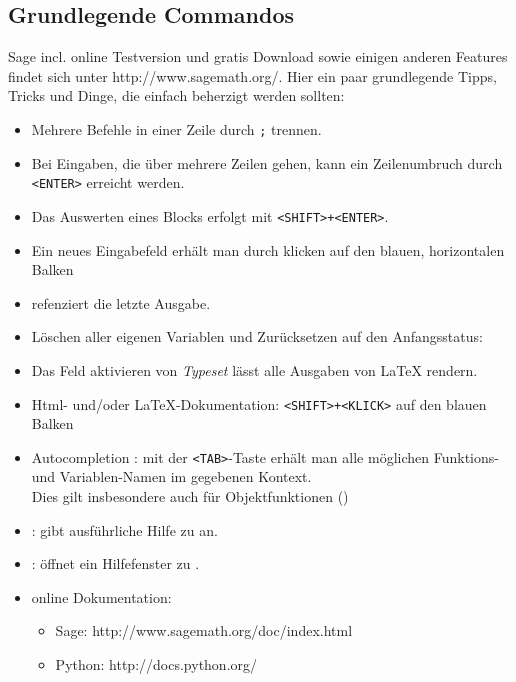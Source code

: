 \documentclass[fontsize=12pt,paper=a4,twoside,bibtotoc,idxtotoc,
liststotoc,pagesize,BCOR1.2cm,DIV15,chapterprefix,pagesize=pdftex]{scrbook}
\theoremstyle{plain}
\theoremstyle{definition}
\theoremstyle{remark}
\begin{document}
\subsection{Grundlegende Commandos}
Sage incl. online Testversion und gratis Download sowie einigen anderen Features findet sich unter http://www.sagemath.org/.
Hier ein paar grundlegende Tipps, Tricks und Dinge, die einfach beherzigt werden sollten:
\begin{itemize}
 \item Mehrere Befehle in einer Zeile durch {\color{blue} \verb~;~} trennen. 
 \item Bei Eingaben, die über mehrere Zeilen gehen, kann ein
  Zeilenumbruch durch {\color{blue} \verb~<ENTER>~} erreicht werden.
 \item Das Auswerten eines Blocks erfolgt mit {\color{blue} \verb~<SHIFT>+<ENTER>~}.
 \item Ein neues Eingabefeld erhält man durch klicken auf den blauen, horizontalen Balken
 \item {\color{blue} \isage{_} } refenziert die letzte Ausgabe.
 \item Löschen aller eigenen Variablen und Zurücksetzen auf den Anfangsstatus: {\color{blue} }
 \item Das Feld aktivieren von \emph{Typeset} lässt alle Ausgaben von \LaTeX{} rendern.
 \item Html- und/oder \LaTeX-Dokumentation:{\color{blue} \verb~<SHIFT>+<KLICK>~ }auf den blauen Balken
 \item {\color{blue} Autocompletion :} mit der {\color{blue} \verb~<TAB>~}-Taste erhält man alle möglichen Funktions- und Variablen-Namen im gegebenen Kontext.\\
  Dies gilt insbesondere auch für Objektfunktionen ()
  \item{\color{blue}  :} gibt ausführliche Hilfe zu  an.
 \item {\color{blue}  :} öffnet ein Hilfefenster zu .
 \item online Dokumentation:
    \begin{itemize}
    \item Sage: http://www.sagemath.org/doc/index.html
    \item Python: http://docs.python.org/
    \end{itemize}
\end{itemize}  
\end{document}
